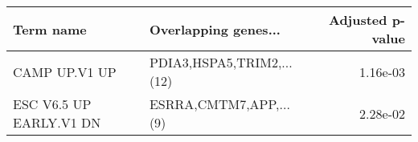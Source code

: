 \begin{tabular}{llr}
\toprule
              Term name &      Overlapping genes... &  Adjusted p-value \\
\midrule
          CAMP UP.V1 UP & PDIA3,HSPA5,TRIM2,...(12) &          1.16e-03 \\
ESC V6.5 UP EARLY.V1 DN &    ESRRA,CMTM7,APP,...(9) &          2.28e-02 \\
\bottomrule
\end{tabular}
